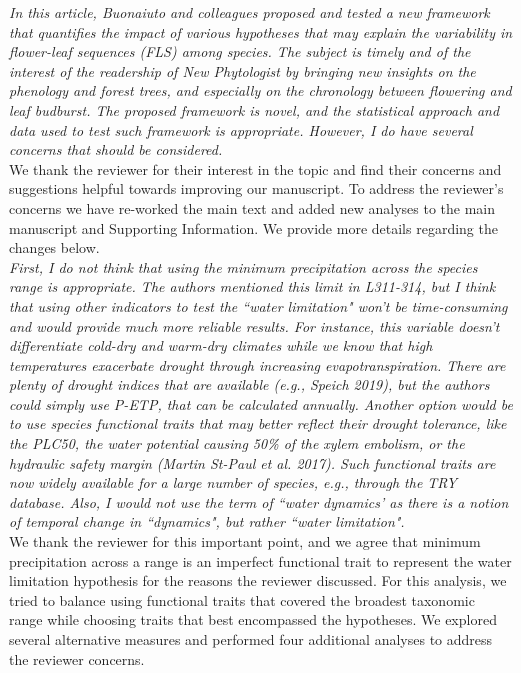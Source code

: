 \documentclass{article}[11pt]
\begin{document}
\emph{In this article, Buonaiuto and colleagues proposed and tested a new framework that quantifies the impact of various hypotheses that may explain the variability in flower-leaf sequences (FLS) among species. The subject is timely and of the interest of the readership of New Phytologist by bringing new insights on the phenology and forest trees, and especially on the chronology between flowering and leaf budburst. The proposed framework is novel, and the statistical approach and data used to test such framework is appropriate. However, I do have several concerns that should be considered.}\\

We thank the reviewer for their interest in the topic and find their concerns and suggestions helpful towards improving our manuscript. To address the reviewer's concerns we have re-worked the main text and added new analyses to the main manuscript and Supporting Information. We provide more details regarding the changes below.\\

\emph{First, I do not think that using the minimum precipitation across the species range is appropriate. The authors mentioned this limit in L311-314, but I think that using other indicators to test the ``water limitation" won't be time-consuming and would provide much more reliable results. For instance, this variable doesn't differentiate cold-dry and warm-dry climates while we know that high temperatures exacerbate drought through increasing evapotranspiration. There are plenty of drought indices that are available (e.g., Speich 2019), but the authors could simply use P-ETP, that can be calculated annually. Another option would be to use species functional traits that may better reflect their drought tolerance, like the PLC50, the water potential causing 50\% of the xylem embolism, or the hydraulic safety margin (Martin St-Paul et al. 2017). Such functional traits are now widely available for a large number of species, e.g., through the TRY database. Also, I would not use the term of ``water dynamics' as there is a notion of temporal change in ``dynamics", but rather ``water limitation".}\\

\noindent We thank the reviewer for this important point, and we agree that minimum precipitation across a range is an imperfect functional trait to represent the water limitation hypothesis for the reasons the reviewer discussed. For this analysis, we tried to balance using functional traits that covered the broadest taxonomic range while choosing traits that best encompassed the hypotheses. We explored several alternative measures and performed four additional analyses to address the reviewer concerns.\\
\end{document}
